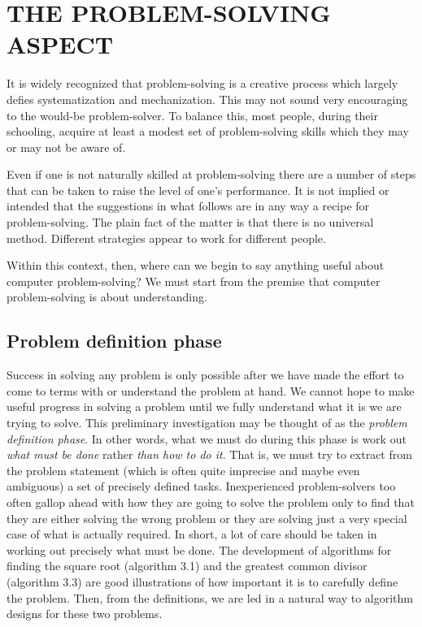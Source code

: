 \documentclass{book}
\begin{document}
\section{THE PROBLEM-SOLVING ASPECT}
	It is widely recognized that problem-solving is a creative process which largely defies systematization and mechanization. This may not sound very encouraging to the would-be problem-solver. To balance this, most people, during their schooling, acquire at least a modest set of problem-solving skills which they may or may not be aware of.\par
	Even if one is not naturally skilled at problem-solving there are a number of steps that can be taken to raise the level of one's performance. It is not implied or intended that the suggestions in what follows are in any way a recipe for problem-solving. The plain fact of the matter is that there is no universal method. Different strategies appear to work for different people.\par
	Within this context, then, where can we begin to say anything useful about computer problem-solving? We must start from the premise that computer problem-solving is about understanding. 

\subsection{Problem definition phase}
	Success in solving any problem is only possible after we have made the effort to come to terms with or understand the problem at hand. We cannot hope to make useful progress in solving a problem until we fully understand what it is we are trying to solve. This preliminary investigation may be thought of as the \textit{problem definition phase}. In other words, what we must do during this phase is work out \textit{what must be done} rather \textit{than how to do it}. That is, we must try to extract from the problem statement (which is often quite imprecise and maybe even ambiguous) a set of precisely defined tasks. Inexperienced problem-solvers too often gallop ahead with how they are going to solve the problem only to find that they are either solving the wrong problem or they are solving just a very special case of what is actually required. In short, a lot of care should be taken in working out precisely what must be done. The development of algorithms for finding the square root (algorithm 3.1) and the greatest common divisor (algorithm 3.3) are good illustrations of how important it is to carefully define the problem. Then, from the definitions, we are led in a natural way to algorithm designs for these two problems. 
\end{document}
